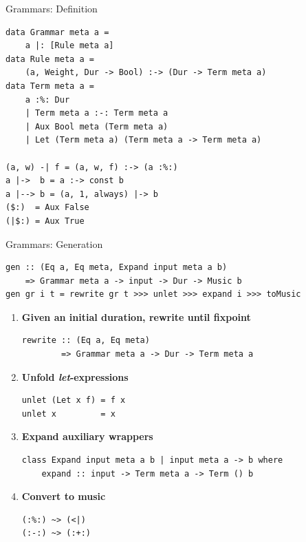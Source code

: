 \documentclass{beamer}
\begin{document}
	\begin{frame}[fragile=singleslide]{Grammars: Definition}
	\begin{verbatim}
data Grammar meta a =
    a |: [Rule meta a]
data Rule meta a =
    (a, Weight, Dur -> Bool) :-> (Dur -> Term meta a)
data Term meta a =
    a :%: Dur
    | Term meta a :-: Term meta a
    | Aux Bool meta (Term meta a)
    | Let (Term meta a) (Term meta a -> Term meta a)

(a, w) -| f = (a, w, f) :-> (a :%:)
a |->  b = a :-> const b
a |--> b = (a, 1, always) |-> b
($:)  = Aux False
(|$:) = Aux True
	\end{verbatim}
	\end{frame}
	
	\begin{frame}[fragile=singleslide]{Grammars: Generation}

    	\begin{verbatim}
gen :: (Eq a, Eq meta, Expand input meta a b)
    => Grammar meta a -> input -> Dur -> Music b
gen gr i t = rewrite gr t >>> unlet >>> expand i >>> toMusic
	\end{verbatim}


	\begin{enumerate}	
	
	\item \textbf{Given an initial duration, rewrite until fixpoint}
	\begin{verbatim}
rewrite :: (Eq a, Eq meta)
        => Grammar meta a -> Dur -> Term meta a
	\end{verbatim}
	
	\item \textbf{Unfold \textit{let}-expressions}
	\begin{verbatim}
unlet (Let x f) = f x
unlet x         = x
	\end{verbatim}
	
	\item \textbf{Expand auxiliary wrappers}
	\begin{verbatim}
class Expand input meta a b | input meta a -> b where
    expand :: input -> Term meta a -> Term () b
	\end{verbatim}
	
	\item \textbf{Convert to music}
	\begin{verbatim}
(:%:) ~> (<|)
(:-:) ~> (:+:)
	\end{verbatim}
		
	\end{enumerate}
	\end{frame}	
	
\end{document}
